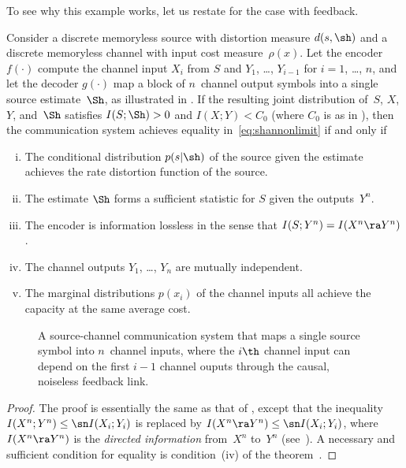 To see why this example works, let us restate  for the case with
feedback. 
\begin{theorem}
  \label{thm:tcntcfb}
  Consider a discrete memoryless source with distortion measure $d(s,\sh)$  and
  a discrete memoryless channel with input cost measure~$\rho(x)$. Let the
  encoder $f(\cdot)$ compute the channel input $X_i$ from $S$ and $Y_1$, \dots,
  $Y_{i-1}$ for $i = 1$, \dots, $n$, and let the decoder $g(\cdot)$ map a block
  of $n$~channel output symbols into a single source estimate~$\Sh$, as
  illustrated in .  If the resulting joint distribution
  of~$S$, $X$, $Y$, and~$\Sh$ satisfies $I(S;\Sh) > 0$ and $I(X;Y) < C_0$ (where
  $C_0$ is as in ), then the communication system achieves
  equality in~\eqref{eq:shannonlimit} if and only if
  \begin{enumerate}[(i)]
    \item The conditional distribution $p(s|\sh)$ of the source given the
          estimate achieves the rate distortion function of the source.

    \item The estimate $\Sh$ forms a sufficient statistic for $S$ given the
      outputs~$Y^n$.

    \item The encoder is information lossless in the sense that $I(S; Y^n) =
      I(X^n \ra Y^n)$. 

    \item The channel outputs $Y_1$, \ldots, $Y_n$ are mutually independent.

    \item The marginal distributions $p(x_i)$ of the channel inputs all achieve
      the capacity at the same average cost.
  \end{enumerate}
\end{theorem}

\begin{figure}
  \begin{center}
    
  \end{center}
  \caption{A source-channel communication system that maps a single source
  symbol into $n$~channel inputs, where the $i\th$ channel input can depend on
  the first $i-1$ channel ouputs through the causal, noiseless feedback link.}
  \label{fig:scgenfeedback}
\end{figure}

\begin{proof}
  The proof is essentially the same as that of , except that the
  inequality $I(X^n;Y^n) \le \sn I(X_i; Y_i)$ is replaced by $I(X^n \ra Y^n) \le
  \sn I(X_i; Y_i)$, where $I(X^n \ra Y^n)$ is the \emph{directed information}
  from~$X^n$ to~$Y^n$ (see~\cite{Massey1990}). A necessary and sufficient
  condition for equality is condition~(iv) of the
  theorem~\cite[Theorem~2]{Massey1990}.
\end{proof}

